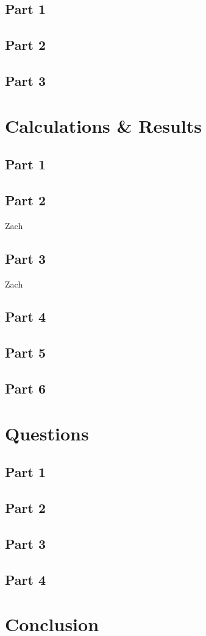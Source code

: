 \documentclass[titlepage]{article}
\begin{document}
	    \subsection{Part 1}
	    \subsection{Part 2} 
	    \subsection{Part 3}
    \section{Calculations & Results}

        \subsection{Part 1} 

        \subsection{Part 2} 
        Zach

        \subsection{Part 3} 
        Zach

        \subsection{Part 4} 
        \subsection{Part 5} 
        \subsection{Part 6} 


	\section{Questions}


    	\subsection{Part 1}

    
    	\subsection{Part 2}

    
        \subsection{Part 3}
    	
        \subsection{Part 4}
    
  	\section{Conclusion}
\end{document}
